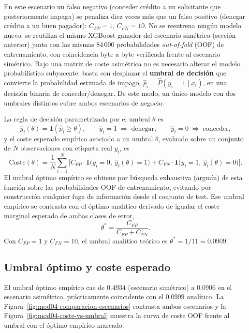 \documentclass[11pt,a4paper]{article}
\begin{document}
En este escenario un falso negativo (conceder cr\'edito a un solicitante que posteriormente
impaga) se penaliza diez veces m\'as que un falso positivo (denegar cr\'edito a un buen
pagador): $C_{FP}=1$, $C_{FN}=10$. No se reentrena ning\'un modelo nuevo: se reutiliza el
mismo XGBoost ganador del escenario sim\'etrico (secci\'on anterior) junto con las mismas
84\,000 probabilidades \emph{out-of-fold} (OOF) de entrenamiento, con coincidencia byte a
byte verificada frente al escenario sim\'etrico. Bajo una matriz de coste asim\'etrica no es
necesario alterar el modelo probabil\'istico subyacente: basta con desplazar el
\textbf{umbral de decisi\'on} que convierte la probabilidad estimada de impago,
$\hat p_i = \hat P(y_i=1\mid x_i)$, en una decisi\'on binaria de conceder/denegar. De este
modo, un \'unico modelo con dos umbrales distintos cubre ambos escenarios de negocio.

La regla de decisi\'on parametrizada por el umbral $\theta$ es
\[
\hat y_i(\theta) = \mathbf{1}\left(\hat p_i \geq \theta\right), \qquad
\hat y_i = 1 \;\Rightarrow\; \text{denegar}, \qquad \hat y_i = 0 \;\Rightarrow\; \text{conceder},
\]
y el coste esperado emp\'irico asociado a un umbral $\theta$, evaluado sobre un conjunto de
$N$ observaciones con etiqueta real $y_i$, es
\[
\mathrm{Coste}(\theta) = \frac{1}{N}\sum_{i=1}^{N}
\Big[ C_{FP}\cdot \mathbf{1}\big(y_i=0,\ \hat y_i(\theta)=1\big)
+ C_{FN}\cdot \mathbf{1}\big(y_i=1,\ \hat y_i(\theta)=0\big) \Big].
\]
El umbral \'optimo emp\'irico se obtiene por b\'usqueda exhaustiva (argm\'in) de esta funci\'on
sobre las probabilidades OOF de entrenamiento, evitando por construcci\'on cualquier fuga de
informaci\'on desde el conjunto de test. Ese umbral emp\'irico se contrasta con el \'optimo
anal\'itico derivado de igualar el coste marginal esperado de ambas clases de error,
\[
\theta^{*} = \frac{C_{FP}}{C_{FP}+C_{FN}}.
\]
Con $C_{FP}=1$ y $C_{FN}=10$, el umbral anal\'itico te\'orico es $\theta^{*} = 1/11 = 0.0909$.

\subsection{Umbral \'optimo y coste esperado}

El umbral \'optimo emp\'irico cae de $0.4934$ (escenario sim\'etrico) a $\mathbf{0.0906}$ en
el escenario asim\'etrico, pr\'acticamente coincidente con el $0.0909$ anal\'itico. La
Figura~\ref{fig:mod04-comparacion-escenarios} contrasta ambos escenarios y la
Figura~\ref{fig:mod04-coste-vs-umbral} muestra la curva de coste OOF frente al umbral con el
\'optimo emp\'irico marcado.
\end{document}
